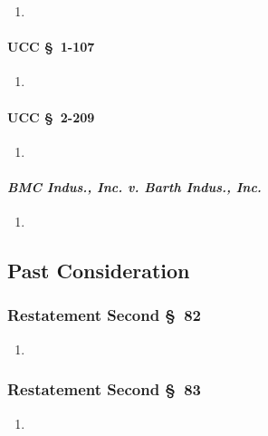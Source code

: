 \begin{enumerate}
    \item %
\end{enumerate}

\paragraph{UCC \S\ 1-107}

\begin{enumerate}
    \item %
\end{enumerate}

\paragraph{UCC \S\ 2-209}

\begin{enumerate}
    \item %
\end{enumerate}

\paragraph{\emph{BMC Indus., Inc. v. Barth Indus., Inc.}}

\begin{enumerate}
    \item %
\end{enumerate}

\subsection{Past Consideration}

\subsubsection{Restatement Second \S\ 82}

\begin{enumerate}
    \item %
\end{enumerate}

\subsubsection{Restatement Second \S\ 83}

\begin{enumerate}
    \item %
\end{enumerate}

